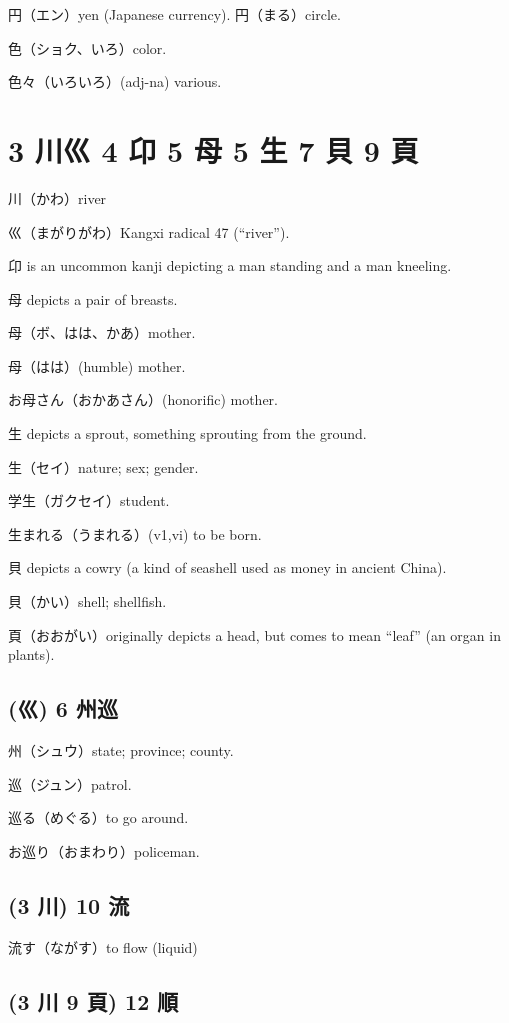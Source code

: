 円（エン）yen (Japanese currency).
円（まる）circle.

色（ショク、いろ）color.

色々（いろいろ）(adj-na) various.

\section{3 川巛 4 卬 5 母 5 生 7 貝 9 頁}

川（かわ）river

巛（まがりがわ）Kangxi radical 47 (``river'').

卬 is an uncommon kanji depicting a man standing and a man kneeling.

母 depicts a pair of breasts.

母（ボ、はは、かあ）mother.

母（はは）(humble) mother.

お母さん（おかあさん）(honorific) mother.

生 depicts a sprout, something sprouting from the ground.

生（セイ）nature; sex; gender.

学生（ガクセイ）student.

生まれる（うまれる）(v1,vi) to be born.

貝 depicts a cowry (a kind of seashell used as money in ancient China).

貝（かい）shell; shellfish.

頁（おおがい）originally depicts a head,
but comes to mean ``leaf'' (an organ in plants).

\subsection{(巛) 6 州巡}

州（シュウ）state; province; county.

巡（ジュン）patrol.

巡る（めぐる）to go around.

お巡り（おまわり）policeman.

\subsection{(3 川) 10 流}

流す（ながす）to flow (liquid)

\subsection{(3 川 9 頁) 12 順}


